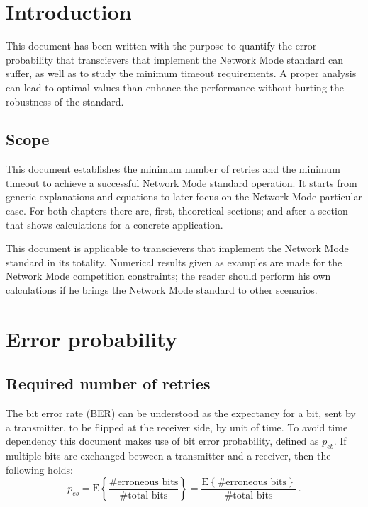 \chapter{Introduction}
This document has been written with the purpose to quantify the error probability that transcievers that implement the Network Mode standard can suffer, as well as to study the minimum timeout requirements. A proper analysis can lead to optimal values than enhance the performance without hurting the robustness of the standard.


\section{Scope}
This document establishes the minimum number of retries and the minimum timeout to achieve a successful Network Mode standard operation. It starts from generic explanations and equations to later focus on the Network Mode particular case. For both chapters there are, first, theoretical sections; and after a section that shows calculations for a concrete application.

This document is applicable to transcievers that implement the Network Mode standard in its totality. Numerical results given as examples are made for the Network Mode competition constraints; the reader should perform his own calculations if he brings the Network Mode standard to other scenarios.


\chapter{Error probability}

\section{Required number of retries}
The bit error rate (BER) can be understood as the expectancy for a bit, sent by a transmitter, to be flipped at the receiver side, by unit of time. To avoid time dependency this document makes use of bit error probability, defined as $p_{eb}$. If multiple bits are exchanged between a transmitter and a receiver, then the following holds:
\begin{equation}
	p_{eb} = \text{E} \left \{ \frac{ \text{\# erroneous bits}}{\text{\# total bits}}  \right \} = \frac{ \text{E} \left \{  \text{\# erroneous bits}  \right \} }{\text{\# total bits}} \ .
\end{equation}

